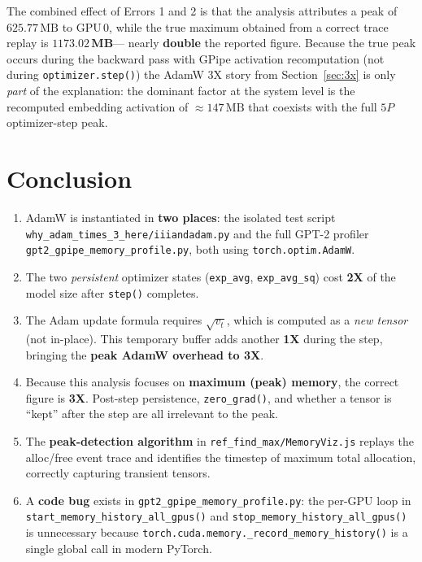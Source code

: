 \documentclass[11pt,a4paper]{article}
\begin{document}
\noindent The combined effect of Errors 1 and 2 is that the analysis
attributes a peak of $625.77\,\text{MB}$ to GPU\,0, while the true maximum
obtained from a correct trace replay is $\mathbf{1173.02\,\text{MB}}$---
nearly \textbf{double} the reported figure.  Because the true peak occurs
during the backward pass with GPipe activation recomputation (not during
\texttt{optimizer.step()}) the AdamW 3X story from
Section~\ref{sec:3x} is only \emph{part} of the explanation: the dominant
factor at the system level is the recomputed embedding activation of
$\approx 147\,\text{MB}$ that coexists with the full $5P$
optimizer-step peak.

\section{Conclusion}
\label{sec:conclusion}

\begin{enumerate}
  \item AdamW is instantiated in \textbf{two places}: the isolated
        test script \texttt{why\_adam\_times\_3\_here/iiiandadam.py} and
        the full GPT-2 profiler \texttt{gpt2\_gpipe\_memory\_profile.py},
        both using \texttt{torch.optim.AdamW}.

  \item The two \emph{persistent} optimizer states (\texttt{exp\_avg},
        \texttt{exp\_avg\_sq}) cost \textbf{2X} of the model size after
        \texttt{step()} completes.

  \item The Adam update formula requires $\sqrt{v_t}$, which is computed
        as a \emph{new tensor} (not in-place).  This temporary buffer adds
        another \textbf{1X} during the step, bringing the \textbf{peak
        AdamW overhead to 3X}.

  \item Because this analysis focuses on \textbf{maximum (peak) memory},
        the correct figure is \textbf{3X}.  Post-step persistence,
        \texttt{zero\_grad()}, and whether a tensor is ``kept'' after the
        step are all irrelevant to the peak.

  \item The \textbf{peak-detection algorithm} in
        \texttt{ref\_find\_max/MemoryViz.js} replays the alloc/free event
        trace and identifies the timestep of maximum total allocation,
        correctly capturing transient tensors.

  \item A \textbf{code bug} exists in \texttt{gpt2\_gpipe\_memory\_profile.py}:
        the per-GPU loop in \texttt{start\_memory\_history\_all\_gpus()} and
        \texttt{stop\_memory\_history\_all\_gpus()} is unnecessary because
        \texttt{torch.cuda.memory.\_record\_memory\_history()} is a single
        global call in modern PyTorch.
\end{enumerate}
\end{document}
